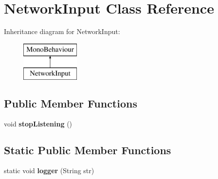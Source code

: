 \hypertarget{class_network_input}{}\section{Network\+Input Class Reference}
\label{class_network_input}
Inheritance diagram for Network\+Input\+:\begin{figure}[H]
\begin{center}
\leavevmode
\includegraphics[height=2.000000cm]{class_network_input}
\end{center}
\end{figure}
\subsection*{Public Member Functions}
\begin{DoxyCompactItemize}
\item 
\hypertarget{class_network_input_ae14c953e88a3205806cc0b2831ab0859}{}void {\bfseries stop\+Listening} ()\label{class_network_input_ae14c953e88a3205806cc0b2831ab0859}

\end{DoxyCompactItemize}
\subsection*{Static Public Member Functions}
\begin{DoxyCompactItemize}
\item 
\hypertarget{class_network_input_a3d501d05461b6e9fd05fc7142eadeb1e}{}static void {\bfseries logger} (String str)\label{class_network_input_a3d501d05461b6e9fd05fc7142eadeb1e}

\end{DoxyCompactItemize}
